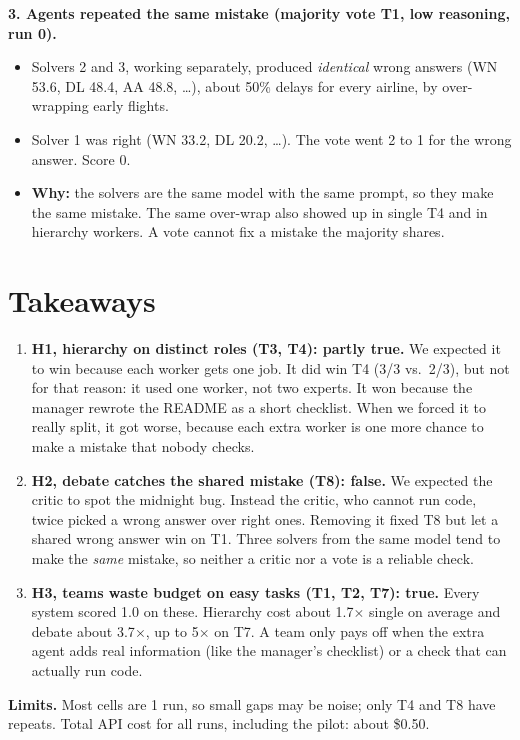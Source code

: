 \documentclass[10pt]{article}
\begin{document}
\textbf{3. Agents repeated the same mistake (majority vote T1, low reasoning, run 0).}
\begin{itemize}
\item Solvers 2 and 3, working separately, produced \emph{identical} wrong answers (WN 53.6, DL 48.4, AA 48.8, \ldots),
  about 50\% delays for every airline, by over-wrapping early flights.
\item Solver 1 was right (WN 33.2, DL 20.2, \ldots). The vote went 2 to 1 for the wrong answer. Score 0.
\item \textbf{Why:} the solvers are the same model with the same prompt, so they make the same mistake. The same
  over-wrap also showed up in single T4 and in hierarchy workers. A vote cannot fix a mistake the majority shares.
\end{itemize}

\section{Takeaways}

\begin{enumerate}
\item \textbf{H1, hierarchy on distinct roles (T3, T4): partly true.} We expected it to win because each worker
  gets one job. It did win T4 (3/3 vs.\ 2/3), but not for that reason: it used one worker, not two experts. It won
  because the manager rewrote the README as a short checklist. When we forced it to really split, it got worse,
  because each extra worker is one more chance to make a mistake that nobody checks.
\item \textbf{H2, debate catches the shared mistake (T8): false.} We expected the critic to spot the midnight bug.
  Instead the critic, who cannot run code, twice picked a wrong answer over right ones. Removing it fixed T8 but
  let a shared wrong answer win on T1. Three solvers from the same model tend to make the \emph{same} mistake, so
  neither a critic nor a vote is a reliable check.
\item \textbf{H3, teams waste budget on easy tasks (T1, T2, T7): true.} Every system scored 1.0 on these. Hierarchy
  cost about 1.7$\times$ single on average and debate about 3.7$\times$, up to 5$\times$ on T7. A team only pays off
  when the extra agent adds real information (like the manager's checklist) or a check that can actually run code.
\end{enumerate}

\textbf{Limits.} Most cells are 1 run, so small gaps may be noise; only T4 and T8 have repeats. Total API cost for
all runs, including the pilot: about \$0.50.
\end{document}
